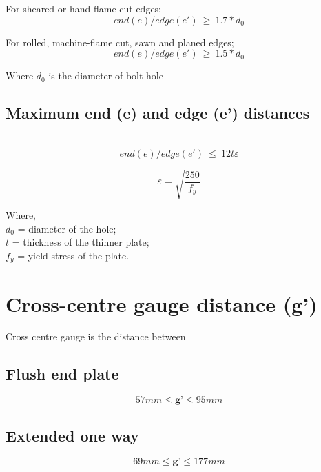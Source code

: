 \documentclass[11.5pt,a4paper,oneside]{report}
\begin{document}
\begin{Form}
For sheared or hand-flame cut edges;
	\begin{equation}
		{end (e)/edge (e')} ~ \geq ~ 1.7 * d_0
	\end{equation}

For rolled, machine-flame cut, sawn and planed edges;
	\begin{equation}
		{end (e)/edge (e')} ~ \geq ~ 1.5 * d_0
	\end{equation}
	
Where $d_0$ is the diameter of bolt hole

\subsection{Maximum end (e) and edge (e') distances}
\qquad \qquad [Reference: Cl. 10.2.4.3, IS 800 : 2007]\\

\begin{equation}
{end (e)/edge (e')} ~ \leq ~ 12  t  \varepsilon
\end{equation}			

	\begin{equation}
		\varepsilon = \sqrt{\frac{250}{f_y}}
	\end{equation}
	
	Where, \\
	\indent $d_0$ = diameter of the hole; \\
	\indent $t$ = thickness of the thinner plate; \\
	\indent $f_y$ = yield stress of the plate.

				
\section{Cross-centre gauge distance (g')} 
Cross centre gauge is the distance between 

		\subsection{Flush end plate}
		\qquad {}
		\begin{equation}
		 	57 mm \leq \textbf{g'} \leq 95 mm 
		\end{equation}
		
		\subsection{Extended one way}
		\qquad {}
		\begin{equation}
			 69 mm \leq \textbf{g'} \leq 177 mm
		\end{equation}


\end{Form}
\end{document}
